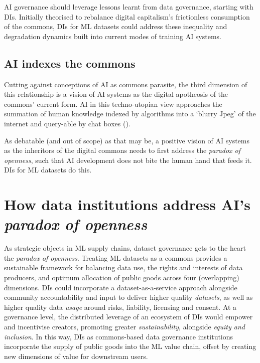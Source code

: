 AI governance should leverage lessons learnt from data governance, starting with DIs. Initially theorised to rebalance digital capitalism’s frictionless consumption of the commons, DIs for ML datasets could address these inequality and degradation dynamics built into current modes of training AI systems.

\subsection*{AI indexes the commons}

Cutting against conceptions of AI as commons parasite, the third dimension of this relationship is a vision of AI systems as the digital apotheosis of the commons' current form. AI in this techno-utopian view approaches the summation of human knowledge indexed by algorithms into a ‘blurry Jpeg’ of the internet and query-able by chat boxes (\cite{Chiang_ted}). 

As debatable (and out of scope) as that may be, a positive vision of AI systems as the inheritors of the digital commons needs to first address the \textit{paradox of openness}, such that AI development does not bite the human hand that feeds it. DIs for ML datasets do this.

\section*{How data institutions address AI's \textit{paradox of openness}}

As strategic objects in ML supply chains, dataset governance gets to the heart the \textit{paradox of openness}. Treating ML datasets as a commons provides a sustainable framework for balancing data use, the rights and interests of data producers, and optimum allocation of public goods across four (overlapping) dimensions. DIs could incorporate a dataset-as-a-service approach alongside community accountability and input to deliver higher quality \textit{datasets}, as well as higher quality data \textit{usage} around risks, liability, licensing and consent. At a governance level, the distributed leverage of an ecosystem of DIs would empower and incentivise creators, promoting greater \textit{sustainability}, alongside \textit{equity and inclusion}. In this way, DIs as commons-based data governance institutions incorporate the supply of public goods into the ML value chain, offset by creating new dimensions of value for downstream users.

